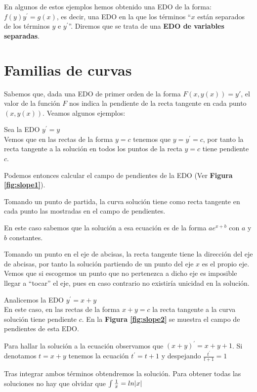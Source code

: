 \documentclass{mathnotes}
\begin{document}
En algunos de estos ejemplos hemos obtenido una EDO de la forma: $f(y)y^\prime = g(x)$, es decir, una EDO en la que los términos ``$x$ están separados de los términos $y$ e $y^\prime$''. Diremos que se trata de una \textbf{EDO de variables separadas}. 
\section{Familias de curvas}

Sabemos que, dada una EDO de primer orden de la forma $F(x,y(x)) = y'$, el valor de la función $F$ nos indica la pendiente de la recta tangente en cada punto $(x, y(x))$.
Veamos algunos ejemplos:


\begin{example}
Sea la EDO $y^\prime = y$\\
Vemos que en las rectas de la forma $y=c$ tenemos que $y=y^\prime = c$, por tanto la recta tangente a la solución en todos los puntos de la recta $y=c$ tiene pendiente $c$.

Podemos entonces calcular el campo de pendientes de la EDO (Ver \textbf{Figura \ref{fig:slope1}}).

Tomando un punto de partida, la curva solución tiene como recta tangente en cada punto las mostradas en el campo de pendientes.

En este caso sabemos que la solución a esa ecuación es de la forma $ae^{x+b}$ con $a$ y $b$ constantes.

Tomando un punto en el eje de abcisas, la recta tangente tiene la dirección del eje de abcisas, por tanto la solución partiendo de un punto del eje $x$ es el propio eje. Vemos que si escogemos un punto que no pertenezca a dicho eje es imposible llegar a ``tocar'' el eje, pues en caso contrario no existiría unicidad en la solución.
\end{example}


\begin{example}
Analicemos la EDO $y^\prime = x+y$\\
En este caso, en las rectas de la forma $x+y=c$ la recta tangente a la curva solución tiene pendiente $c$.
En la \textbf{Figura \ref{fig:slope2}} se muestra el campo de pendientes de esta EDO.

Para hallar la solución a la ecuación observamos que $(x+y)^\prime = x+y+1$. Si denotamos $t=x+y$ tenemos la ecuación $t^\prime=t+1$ y despejando $\frac{t^\prime}{t+1} = 1$

Tras integrar ambos términos obtendremos la solución.
Para obtener todas las soluciones no hay que olvidar que $\int \frac{1}{x} = ln|x|$
\end{example}
\end{document}
